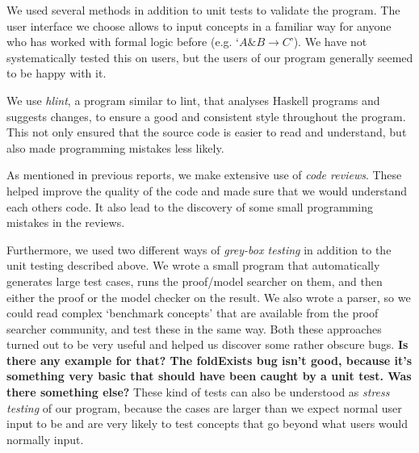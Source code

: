 We used several methods in addition to unit tests to validate the program.
The user interface we choose allows to input concepts in a familiar way for anyone
who has worked with formal logic before (e.g. `$A \& B \rightarrow C$'). We have not systematically
tested this on users, but the users of our program generally seemed to be happy with it.

We use \emph{hlint}, a program similar to lint, that analyses Haskell programs and
suggests changes, to ensure a good and consistent style throughout the program. This
not only ensured that the source code is easier to read and understand, but also
made programming mistakes less likely.

As mentioned in previous reports, we make extensive use of \emph{code reviews}. These
helped improve the quality of the code and made sure that we would understand
each others code. It also lead to the discovery of some small programming mistakes
in the reviews.

Furthermore, we used two different ways of \emph{grey-box testing} in addition to
the unit testing described above. We wrote a small program that automatically generates
large test cases, runs the proof/model searcher on them, and then either the proof
or the model checker on the result. We also wrote a parser, so we could read complex
`benchmark concepts' that are available from the proof searcher community, and
test these in the same way. Both these approaches turned out to be very
useful and helped us discover some rather obscure bugs. \textbf{Is there any
example for that? The foldExists bug isn't good, because it's something very
basic that should have been caught by a unit test. Was there something else?}
These kind of tests can also be understood as \emph{stress testing} of our
program, because the cases are larger than we expect normal user input to be
and are very likely to test concepts that go beyond what users would normally
input.